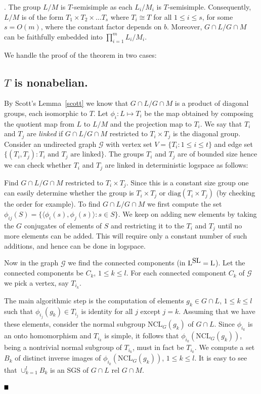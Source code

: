 \documentclass[11pt]{article}
\newcommand{\bproof}{\noindent{\it Proof}}
\newcommand{\eproof}{\hspace*{\fill}$\rule{2mm}{2mm}$~~~~~\bigskip}
\renewenvironment{proof}{\bproof. }{\eproof}
\newcommand{\Lo}{\ensuremath{\mathrm{L}}}
\newcommand{\SL}{\mbox{\rm SL}}
\newcommand{\NCL}[2]{\ensuremath{\mathrm{NCL}_{#1}({#2})}}
\begin{document}
\begin{proof}
  The group $L/M$ is $T$-semisimple as each $L_i/M_i$ is
  $T$-semisimple. Consequently, $L/M$ is of the form $T_1 \times T_2
  \times \ldots T_s$ where $T_i \cong T$ for all $1 \leq i \leq s$,
  for some $s=O(m)$, where the constant factor depends on
  $b$. Moreover, $G\cap L /G \cap M$ can be faithfully embedded into
  $\prod_{i=1}^m L_i/M_i$.  

We handle the proof of the theorem in two cases:

\subsection*{$T$ is nonabelian.} 

By Scott's Lemma~\ref{scott} we know that $G\cap L / G \cap M$ is a
product of diagonal groups, each isomorphic to $T$. Let $\phi_i : L
\mapsto T_i$ be the map obtained by composing the quotient map {from}
$L$ to $L/M$ and the projection map to $T_i$. We say that $T_i$ and
$T_j$ are \emph{linked} if $G \cap L/ G\cap M$ restricted to $T_i
\times T_j$ is the diagonal group. Consider an undirected graph
$\mathcal{G}$ with vertex set $V = \{ T_i : 1 \leq i \leq t \}$ and
edge set $ \{(T_i,T_j) : T_i \textrm{ and } T_j \textrm{ are
linked}\}$. The groups $T_i$ and $T_j$ are of bounded size hence we
can check whether $T_i$ and $T_j$ are linked in deterministic logspace
as follows:
  
Find $G\cap L/G\cap M$ restricted to $T_i \times T_j$. Since this is a
constant size group one can easily determine whether the group is $T_i
\times T_j$ or $\mathrm{diag}(T_i\times T_j)$ (by checking the order
for example). To find $G \cap L / G \cap M$ we first compute the set
$\phi_{ij}(S) = \{ \langle \phi_i(s) , \phi_j(s) \rangle : s \in
S\}$. We keep on adding new elements by taking the $G$ conjugates of
elements of $S$ and restricting it to the $T_i$ and $T_j$ until no
more elements can be added. This will require only a constant number
of such additions, and hence can be done in logspace.
  
Now in the graph $\mathcal{G}$ we find the connected components (in
$\Lo^{\SL}=\Lo$). Let the connected components be $C_k$, $1 \leq k \leq
l$. For each connected component $C_k$ of $\mathcal{G}$ we pick a
vertex, say $T_{i_k}$.


The main algorithmic step is the computation of elements $g_k \in G
\cap L$, $1 \leq k \leq l$ such that $\phi_{i_j}(g_k) \in T_{i_j}$ is
identity for all $j$ except $j = k$. Assuming that we have these
elements, consider the normal subgroup $\NCL{G}{g_k}$ of $G\cap
L$. Since $\phi_{i_k}$ is an onto homomorphism and $T_{i_k}$ is
simple, it follows that $\phi_{i_k}(\NCL{G}{g_k})$, being a nontrivial
normal subgroup of $T_{i_k}$, must in fact be $T_{i_k}$. We compute a
set $B_k$ of distinct inverse images of $\phi_{i_k}(\NCL{G}{g_k})$, $1
\leq k \leq l$. It is easy to see that $\cup_{k=1}^l B_k$ is an SGS of
$G \cap L$ rel $G \cap M$.


\end{proof}
\end{document}

